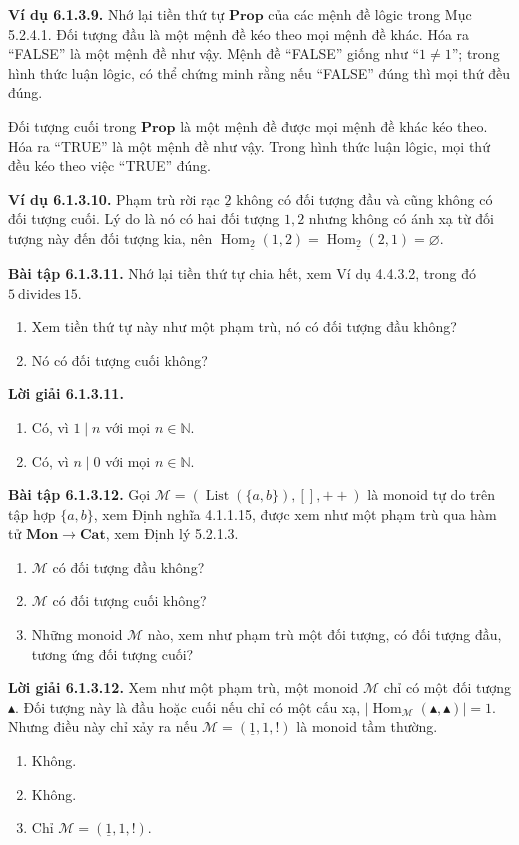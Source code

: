 \noindent\textbf{Ví dụ 6.1.3.9.} Nhớ lại tiền thứ tự $\mathbf{Prop}$ của các mệnh đề lôgic trong Mục 5.2.4.1. Đối tượng đầu là một mệnh đề kéo theo mọi mệnh đề khác. Hóa ra ``FALSE'' là một mệnh đề như vậy. Mệnh đề ``FALSE'' giống như ``$1\ne1$''; trong hình thức luận lôgic, có thể chứng minh rằng nếu ``FALSE'' đúng thì mọi thứ đều đúng.

Đối tượng cuối trong $\mathbf{Prop}$ là một mệnh đề được mọi mệnh đề khác kéo theo. Hóa ra ``TRUE'' là một mệnh đề như vậy. Trong hình thức luận lôgic, mọi thứ đều kéo theo việc ``TRUE'' đúng.

\noindent\textbf{Ví dụ 6.1.3.10.} Phạm trù rời rạc $\underline2$ không có đối tượng đầu và cũng không có đối tượng cuối. Lý do là nó có hai đối tượng $1,2$ nhưng không có ánh xạ từ đối tượng này đến đối tượng kia, nên $\operatorname{Hom}_{\underline2}(1,2)=\operatorname{Hom}_{\underline2}(2,1)=\varnothing$.

\noindent\textbf{Bài tập 6.1.3.11.} Nhớ lại tiền thứ tự chia hết, xem Ví dụ 4.4.3.2, trong đó $5\ \mathrm{divides}\ 15$.
\begin{enumerate}[label=\alph*.]\item Xem tiền thứ tự này như một phạm trù, nó có đối tượng đầu không?\item Nó có đối tượng cuối không?\end{enumerate}
\noindent\textbf{Lời giải 6.1.3.11.}\keepwithnext
\begin{enumerate}[label=\alph*.]\item Có, vì $1\mid n$ với mọi $n\in\mathbb N$.\item Có, vì $n\mid0$ với mọi $n\in\mathbb N$.\end{enumerate}

\noindent\textbf{Bài tập 6.1.3.12.} Gọi $\mathcal M=(\operatorname{List}(\{a,b\}),[],\mathbin{+\!+})$ là monoid tự do trên tập hợp $\{a,b\}$, xem Định nghĩa 4.1.1.15, được xem như một phạm trù qua hàm tử $\mathbf{Mon}\to\mathbf{Cat}$, xem Định lý 5.2.1.3.
\begin{enumerate}[label=\alph*.]\item $\mathcal M$ có đối tượng đầu không?\item $\mathcal M$ có đối tượng cuối không?\item Những monoid $\mathcal M$ nào, xem như phạm trù một đối tượng, có đối tượng đầu, tương ứng đối tượng cuối?\end{enumerate}

\noindent\textbf{Lời giải 6.1.3.12.} Xem như một phạm trù, một monoid $\mathcal M$ chỉ có một đối tượng $\blacktriangle$. Đối tượng này là đầu hoặc cuối nếu chỉ có một cấu xạ, $|\operatorname{Hom}_{\mathcal M}(\blacktriangle,\blacktriangle)|=1$. Nhưng điều này chỉ xảy ra nếu $\mathcal M=(\underline1,1,!)$ là monoid tầm thường.
\begin{enumerate}[label=\alph*.]\item Không.\item Không.\item Chỉ $\mathcal M=(\underline1,1,!)$.\end{enumerate}

